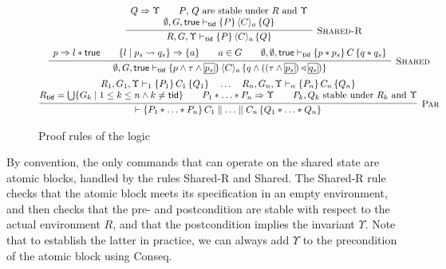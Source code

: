 \begin{figure}[t]
{\[\begin{array}{@{}c@{}}
{\begin{array}{@{}c@{}}
\end{array}
}
\quad
\infer[\textsc{Shared-R}]{
R, G, \Upsilon \vdash_\ltid \{P\}\, 
\langle C\rangle_a \, 
\{ Q \} %
}{
\begin{array}{c}
Q \Rightarrow \Upsilon \qquad
\text{$P$, $Q$ are stable under $R$ and $\Upsilon$}
\\%
\emptyset,G,\true \vdash_\ltid \{ P \} \,\langle C\rangle_a\, \{ Q \}
\end{array}
}
\\[5pt]
\infer[\textsc{Shared}]{
\emptyset, G, \true \vdash_\ltid \{p \wedge  \tau \wedge \shareds{p_s}\}\, 
\langle C\rangle_a\, 
\{ q \wedge ((\tau \wedge \shareds{p_s}) \extend \shareds{q_s}) \}
}{
\begin{array}{c}
p \Rightarrow l * \true
\qquad
\{l \mid p_s \leadsto q_s\} \Rightarrow \{a\} 
\qquad
a \in G
\qquad
\emptyset,\emptyset,\true \vdash_\ltid \{ p * p_s \} \,C\, \{ q * q_s \}
\end{array}
}
\\[5pt]
\begin{array}{@{}r@{}}
\infer[\textsc{Par}]{
 \vdash \{P_1 * \ldots * P_n\}\,C_1 \parallel \ldots \parallel C_n\,\{Q_1 * \ldots * Q_n\}
}{
\begin{array}{@{}c@{}}
R_1,G_1,\Upsilon  \vdash_1 \{P_1\}\,C_1\,\{Q_1\} \quad
\ldots\quad
R_n,G_n,\Upsilon  \vdash_n \{P_n\}\,C_n\,\{Q_n\}\\%
R_\ltid = \bigcup\{G_k \mid 1\leq k \leq n \land  k\neq \ltid\}
\qquad
P_1 * \ldots * P_n \Rightarrow \Upsilon
\qquad
P_k, Q_k \mbox{ stable under } R_k \mbox{ and } \Upsilon
\end{array}
}
\end{array}
\end{array}
\]
}
\vspace{-10pt}
\caption{\small Proof rules of the logic}
\label{fig:logic-rules}
\end{figure}





By convention, the only commands that can operate on the shared state are atomic
blocks, handled by the rules {\sc Shared-R} and {\sc Shared}.  The {\sc
  Shared-R} rule checks that the atomic block meets its specification in an
empty environment, and then checks that the pre- and postcondition are stable
with respect to the actual environment $R$, and that the postcondition implies
the invariant $\Upsilon$. Note that to establish the latter in practice, we can
always add $\Upsilon$ to the precondition of the atomic block using {\sc
  Conseq}.


